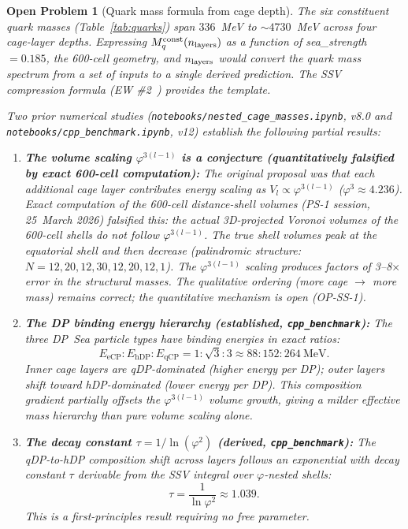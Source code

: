 \documentclass[11pt,a4paper]{article}
\newtheorem{openprob}[theorem]{Open Problem}
\newcommand{\eCP}{\mathrm{eCP}}
\newcommand{\hDP}{\mathrm{hDP}}
\newcommand{\qCP}{\mathrm{qCP}}
\newcommand{\phig}{\varphi}
\begin{document}
\begin{openprob}[Quark mass formula from cage depth]
\label{op:mq}
The six constituent quark masses (Table~\ref{tab:quarks}) span
$336$~MeV to $\sim 4730$~MeV across four cage-layer depths.
Expressing $M_q^{\rm const}(n_{\rm layers})$ as a function of
sea\_strength $= 0.185$, the 600-cell geometry, and $n_{\rm layers}$
would convert the quark mass spectrum from a set of inputs to a
single derived prediction.  The SSV compression formula (EW
\#2~\citep{cpp_ew2}) provides the template.

Two prior numerical studies (\texttt{notebooks/nested\_cage\_masses.ipynb},
v8.0 and \texttt{notebooks/cpp\_benchmark.ipynb}, v12) establish the
following partial results:

\begin{enumerate}
\item \textbf{The volume scaling $\phig^{3(l-1)}$ is a conjecture
  (quantitatively falsified by exact 600-cell computation):}
  The original proposal was that each additional cage layer
  contributes energy scaling as $V_l \propto \phig^{3(l-1)}$
  ($\phig^3 \approx 4.236$).  Exact computation of the 600-cell
  distance-shell volumes (PS-1 session, 25~March 2026) falsified
  this: the actual 3D-projected Voronoi volumes of the 600-cell
  shells do \emph{not} follow $\phig^{3(l-1)}$.  The true shell
  volumes peak at the equatorial shell and then \emph{decrease}
  (palindromic structure: $N = 12, 20, 12, 30, 12, 20, 12, 1$).
  The $\phig^{3(l-1)}$ scaling produces factors of 3--8$\times$
  error in the structural masses.  The qualitative ordering
  (more cage $\to$ more mass) remains correct; the quantitative
  mechanism is open (OP-SS-1).

\item \textbf{The DP binding energy hierarchy (established,
  \texttt{cpp\_benchmark}):}
  The three DP~Sea particle types have binding energies in exact
  ratios:
  \begin{equation}
  E_{\eCP} : E_{\hDP} : E_{\qCP}
  = 1 : \sqrt{3} : 3
  \approx 88 : 152 : 264\ \text{MeV}.
  \label{eq:dp_energies}
  \end{equation}
  Inner cage layers are qDP-dominated (higher energy per DP);
  outer layers shift toward hDP-dominated (lower energy per DP).
  This composition gradient partially offsets the $\phig^{3(l-1)}$
  volume growth, giving a milder effective mass hierarchy than
  pure volume scaling alone.

\item \textbf{The decay constant $\tau = 1/\ln(\phig^2)$
  (derived, \texttt{cpp\_benchmark}):}
  The qDP-to-hDP composition shift across layers follows an
  exponential with decay constant $\tau$ derivable from the SSV
  integral over $\phig$-nested shells:
  \begin{equation}
  \tau = \frac{1}{\ln \phig^2} \approx 1.039.
  \label{eq:tau}
  \end{equation}
  This is a first-principles result requiring no free parameter.


\end{enumerate}
\end{openprob}
\end{document}
